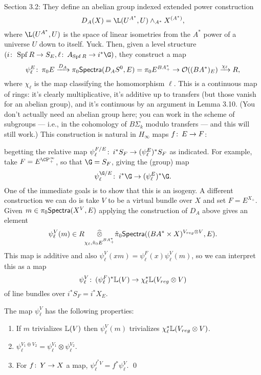 Section 3.2: They define an abelian group indexed extended power construction \[D_A(X) = \L(U^{A^*}, U) \sm_{A^*} X^{(A^*)},\] where $\L(U^{A^*}, U)$ is the space of linear isometries from the $A^*${\th} power of a universe $U$ down to itself.  Yuck.  Then, given a level structure $(i\co \Spf R \to S_E, \ell\co A_{\Spf R} \to i^* \G)$, they construct a map \[\psi^E_\ell \colon\thinspace \pi_0 E \xrightarrow{D_A} \pi_0 \mathsf{Spectra}(D_A S^0, E) = \pi_0 E^{BA^*_+} \to \mathcal{O}((BA^*)_E) \xrightarrow{\chi_\ell} R,\] where $\chi_\ell$ is the map classifying the homomorphism $\ell$.  This is a continuous map of rings: it's clearly multiplicative, it's additive up to transfers (but those vanish for an abelian group), and it's continuous by an argument in Lemma 3.10.  (You don't actually need an abelian group here; you can work in the scheme of subgroups --- i.e., in the cohomology of $B\Sigma_k$ modulo transfers --- and this will still work.)  This construction is natural in $H_\infty$ maps $f\colon\thinspace E \to F$:
\begin{center}
\end{center}
begetting the relative map $\psi_\ell^{F/E}\colon\thinspace i^* S_F \to (\psi_\ell^E)^* S_F$ as indicated.  For example, take $F = E^{\CP^\infty_+}$, so that $\G = S_F$, giving the (group) map \[\psi_\ell^{\G/E}\co i^* \G \to (\psi_\ell^E)^* \G.\]  One of the immediate goals is to show that this is an isogeny.  A different construction we can do is take $V$ to be a virtual bundle over $X$ and set $F = E^{X_+}$.  Given $m \in \pi_0 \mathsf{Spectra}(X^V, E)$ applying the construction of $D_A$ above gives an element \[\psi_\ell^V(m) \in R \underset{\chi_\ell, \hat\pi_0 E^{BA^*_+}}{\widehat{\otimes}} \hat\pi_0 \mathsf{Spectra}((BA^* \times X)^{V_{reg} \otimes V}, E).\]  This map is additive and also $\psi_\ell^V(xm) = \psi_\ell^F(x) \psi_\ell^V(m)$, so we can interpret this as a map \[\psi_\ell^V\colon\thinspace (\psi_\ell^F)^* \mathbb{L}(V) \to \chi_\ell^*\mathbb{L}(V_{reg} \otimes V)\] of line bundles over $i^* S_F = i^* X_E$.

\begin{lemma}
The map $\psi_\ell^V$ has the following properties:
\begin{enumerate}
\item If $m$ trivializes $\mathbb{L}(V)$ then $\psi_\ell^V(m)$ trivializes $\chi_\ell^* \mathbb{L}(V_{reg} \otimes V)$.
\item $\psi_\ell^{V_1 \oplus V_2} = \psi_\ell^{V_1} \otimes \psi_\ell^{V_2}$.
\item For $f\colon\thinspace Y \to X$ a map, $\psi_\ell^{f^* V} = f^* \psi_\ell^V$. \qed
\end{enumerate}
\end{lemma}

